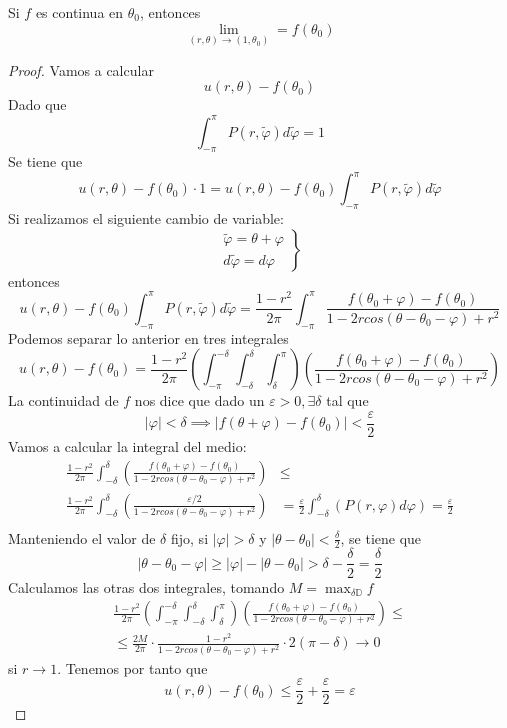 \begin{theorem}

Si $f$ es continua en $\theta_0$, entonces
$$\lim_{(r,\theta)\to(1,\theta_0)}=f(\theta_0)$$
\end{theorem}
\begin{proof}
Vamos a calcular
$$u(r,\theta)-f(\theta_0)$$
Dado que $$\int_{-\pi}^{\pi}P(r,\tilde{\varphi})d\tilde{\varphi} = 1$$
Se tiene que 
$$u(r,\theta)-f(\theta_0)\cdot 1 = u(r,\theta)-f(\theta_0)\int_{-\pi}^{\pi}P(r,\tilde{\varphi})d\tilde{\varphi}$$
Si realizamos el siguiente cambio de variable:
\begin{equation*}
\left.
\begin{array}{l}
\tilde{\varphi} = \theta+\varphi\\
d\tilde{\varphi} = d\varphi
\end{array}
\right\}
\end{equation*}
entonces
$$u(r,\theta)-f(\theta_0)\int_{-\pi}^{\pi}P(r,\tilde{\varphi})d\tilde{\varphi}=\frac{1-r^2}{2\pi}\int_{-\pi}^{\pi}\frac{f(\theta_0+\varphi)-f(\theta_0)}{1-2rcos(\theta-\theta_0-\varphi)+r^2}$$
Podemos separar lo anterior en tres integrales
$$u(r,\theta)-f(\theta_0)=\frac{1-r^2}{2\pi}\left(\int_{-\pi}^{-\delta}\int_{-\delta}^{\delta}\int_{\delta}^{\pi}\right)\left(\frac{f(\theta_0+\varphi)-f(\theta_0)}{1-2rcos(\theta-\theta_0-\varphi)+r^2}\right)$$
La continuidad de $f$ nos dice que dado un $\varepsilon>0, \exists\delta$ tal que
$$|\varphi|<\delta \implies |f(\theta+\varphi)-f(\theta_0)| < \frac{\varepsilon}{2}$$
Vamos a calcular la integral del medio:
\begin{align*}
\frac{1-r^2}{2\pi}\int_{-\delta}^{\delta}\left(\frac{f(\theta_0+\varphi)-f(\theta_0)}{1-2rcos(\theta-\theta_0-\varphi)+r^2}\right) & \le \\
\frac{1-r^2}{2\pi}\int_{-\delta}^{\delta}\left(\frac{\varepsilon/2}{1-2rcos(\theta-\theta_0-\varphi)+r^2}\right) & =
\frac{\varepsilon}{2}\int_{-\delta}^{\delta}\left(P(r,\varphi)d\varphi\right) = \frac{\varepsilon}{2}\\
\end{align*}
Manteniendo el valor de $\delta$ fijo, si $|\varphi| > \delta$ y $|\theta-\theta_0|<\frac{\delta}{2}$, se tiene que
$$|\theta-\theta_0-\varphi| \ge |\varphi|-|\theta-\theta_0|>\delta-\frac{\delta}{2} = \frac{\delta}{2}$$
Calculamos las otras dos integrales, tomando $M=\max_{\delta\mathbb{D}}f$
\begin{align*}
\frac{1-r^2}{2\pi}\left(\int_{-\pi}^{-\delta}\int_{-\delta}^{\delta}\int_{\delta}^{\pi}\right)\left(\frac{f(\theta_0+\varphi)-f(\theta_0)}{1-2rcos(\theta-\theta_0-\varphi)+r^2}\right)\le \\
\le \frac{2M}{2\pi}\cdot\frac{1-r^2}{1-2rcos(\theta-\theta_0-\varphi)+r^2}\cdot 2(\pi-\delta)\to 0
\end{align*}
si $r\to 1$.
Tenemos por tanto que
$$u(r,\theta)-f(\theta_0) \le \frac{\varepsilon}{2} + \frac{\varepsilon}{2} = \varepsilon$$
\end{proof}

